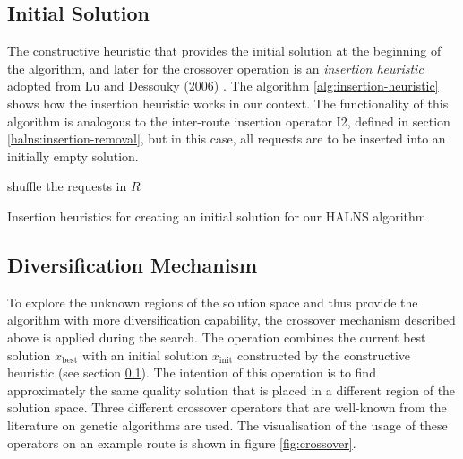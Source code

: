     \subsection{Initial Solution} \label{halns:init-solution}
    
    The constructive heuristic that provides the initial solution at the beginning of the algorithm, and later for the crossover operation is an \emph{insertion heuristic} adopted from Lu and Dessouky (2006) \cite{insertionHeuristics}. The algorithm \ref{alg:insertion-heuristic} shows how the insertion heuristic works in our context. The functionality of this algorithm is analogous to the inter-route insertion operator I2, defined in section \ref{halns:insertion-removal}, but in this case, all requests are to be inserted into an initially empty solution.
    
    
    \begin{algorithm}[!ht]
    shuffle the requests in $R$\;
    \caption{Insertion heuristics for creating an initial solution for our HALNS algorithm}
    \label{alg:insertion-heuristic}
    \end{algorithm}
    
    
    \subsection{Diversification Mechanism} \label{halns:diversification}
    
    To explore the unknown regions of the solution space and thus provide the algorithm with more diversification capability, the crossover mechanism described above is applied during the search. The operation combines the current best solution $x_{\mathrm{best}}$ with an initial solution $x_{\mathrm{init}}$ constructed by the constructive heuristic (see section \ref{halns:init-solution}). The intention of this operation is to find approximately the same quality solution that is placed in a different region of the solution space. Three different crossover operators that are well-known from the literature on genetic algorithms are used. The visualisation of the usage of these operators on an example route is shown in figure \ref{fig:crossover}.
    
